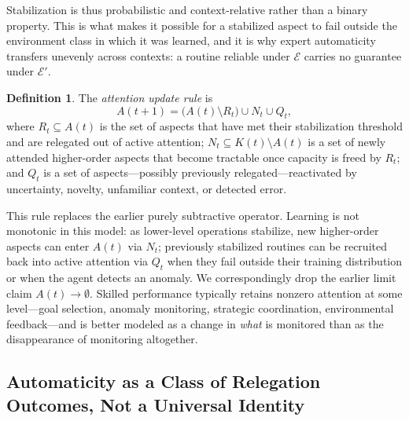 \documentclass[12pt, a4paper]{article}
\theoremstyle{plain}
\theoremstyle{definition}
\newtheorem{definition}[proposition]{Definition}
\theoremstyle{remark}
\begin{document}
Stabilization is thus probabilistic and context-relative rather than a binary property. This is what makes it possible for a stabilized aspect to fail outside the environment class in which it was learned, and it is why expert automaticity transfers unevenly across contexts: a routine reliable under $\mathcal{E}$ carries no guarantee under $\mathcal{E}'$.

\begin{definition}
The \emph{attention update rule} is
\[
A(t+1) = \bigl(A(t) \setminus R_t\bigr) \cup N_t \cup Q_t,
\]
where $R_t \subseteq A(t)$ is the set of aspects that have met their stabilization threshold and are relegated out of active attention; $N_t \subseteq K(t) \setminus A(t)$ is a set of newly attended higher-order aspects that become tractable once capacity is freed by $R_t$; and $Q_t$ is a set of aspects---possibly previously relegated---reactivated by uncertainty, novelty, unfamiliar context, or detected error.
\end{definition}

This rule replaces the earlier purely subtractive operator. Learning is not monotonic in this model: as lower-level operations stabilize, new higher-order aspects can enter $A(t)$ via $N_t$; previously stabilized routines can be recruited back into active attention via $Q_t$ when they fail outside their training distribution or when the agent detects an anomaly. We correspondingly drop the earlier limit claim $A(t) \to \emptyset$. Skilled performance typically retains nonzero attention at some level---goal selection, anomaly monitoring, strategic coordination, environmental feedback---and is better modeled as a change in \emph{what} is monitored than as the disappearance of monitoring altogether.

\subsection{Automaticity as a Class of Relegation Outcomes, Not a Universal Identity}
\label{subsec:type1type2}
\end{document}
